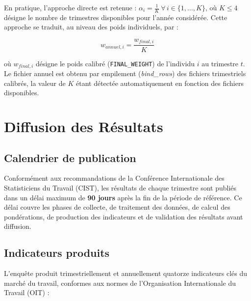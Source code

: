 \documentclass[12pt, a4paper]{article}
\begin{document}
En pratique, l'approche directe est retenue : $\alpha_{i} = \frac{1}{K}\ \forall\, i \in \{1,\ldots,K\}$, où $K \leq 4$ désigne le nombre de trimestres disponibles pour l'année considérée. Cette approche se traduit, au niveau des poids individuels, par :

\begin{equation}
  w_{annuel,i} = \frac{w_{final,i}}{K}
\end{equation}

où $w_{final,i}$ désigne le poids calibré (\texttt{FINAL\_WEIGHT}) de l'individu $i$ au trimestre $t$. Le fichier annuel est obtenu par empilement (\textit{bind\_rows}) des fichiers trimestriels calibrés, la valeur de $K$ étant détectée automatiquement en fonction des fichiers disponibles.

\section{Diffusion des Résultats}

\subsection{Calendrier de publication}

Conformément aux recommandations de la Conférence Internationale des Statisticiens du Travail (CIST), les résultats de chaque trimestre sont publiés dans un délai maximum de \textbf{90 jours} après la fin de la période de référence. Ce délai couvre les phases de collecte, de traitement des données, de calcul des pondérations, de production des indicateurs et de validation des résultats avant diffusion.

\subsection{Indicateurs produits}

L'enquête produit trimestriellement et annuellement quatorze indicateurs clés du marché du travail, conformes aux normes de l'Organisation Internationale du Travail (OIT) :
\end{document}
